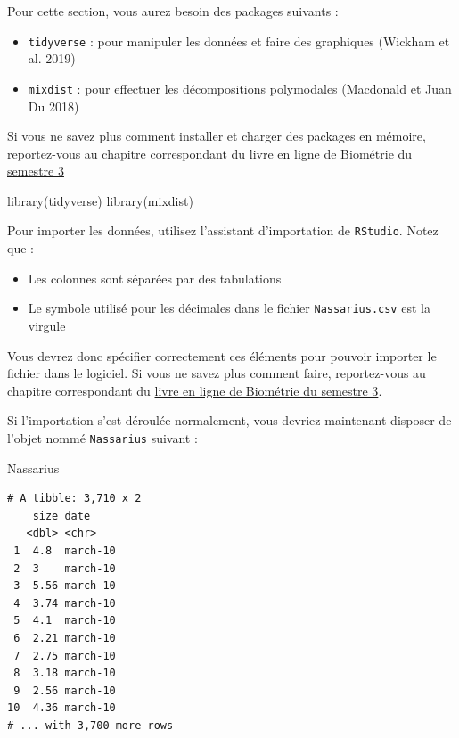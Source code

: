 \documentclass[
  a4paper,
  DIV=11,
  numbers=noendperiod,
  oneside]{scrreprt}
\newenvironment{Shaded}{}{}
\newcommand{\FunctionTok}[1]{\textcolor[rgb]{0.44,0.26,0.76}{#1}}
\newcommand{\NormalTok}[1]{\textcolor[rgb]{0.14,0.16,0.18}{#1}}
\providecommand{\tightlist}{%
  \setlength{\itemsep}{0pt}\setlength{\parskip}{0pt}}\usepackage{longtable,booktabs,array}
\begin{document}
Pour cette section, vous aurez besoin des packages suivants :

\begin{itemize}
\tightlist
\item
  \texttt{tidyverse} : pour manipuler les données et faire des
  graphiques (Wickham et al. 2019)
\item
  \texttt{mixdist} : pour effectuer les décompositions polymodales
  (Macdonald et Juan Du 2018)
\end{itemize}

Si vous ne savez plus comment installer et charger des packages en
mémoire, reportez-vous au chapitre correspondant du
\href{https://besibo.github.io/BiometrieS3/01-R-basics.html\#sec-packages}{livre
en ligne de Biométrie du semestre 3}

\begin{Shaded}
\begin{Highlighting}[]
\FunctionTok{library}\NormalTok{(tidyverse)}
\FunctionTok{library}\NormalTok{(mixdist)}
\end{Highlighting}
\end{Shaded}

Pour importer les données, utilisez l'assistant d'importation de
\texttt{RStudio}. Notez que :

\begin{itemize}
\tightlist
\item
  Les colonnes sont séparées par des tabulations
\item
  Le symbole utilisé pour les décimales dans le fichier
  \texttt{Nassarius.csv} est la virgule
\end{itemize}

Vous devrez donc spécifier correctement ces éléments pour pouvoir
importer le fichier dans le logiciel. Si vous ne savez plus comment
faire, reportez-vous au chapitre correspondant du
\href{https://besibo.github.io/BiometrieS3/04-DataWrangling.html\#plaintext}{livre
en ligne de Biométrie du semestre 3}.

Si l'importation s'est déroulée normalement, vous devriez maintenant
disposer de l'objet nommé \texttt{Nassarius} suivant :

\begin{Shaded}
\begin{Highlighting}[]
\NormalTok{Nassarius}
\end{Highlighting}
\end{Shaded}

\begin{verbatim}
# A tibble: 3,710 x 2
    size date    
   <dbl> <chr>   
 1  4.8  march-10
 2  3    march-10
 3  5.56 march-10
 4  3.74 march-10
 5  4.1  march-10
 6  2.21 march-10
 7  2.75 march-10
 8  3.18 march-10
 9  2.56 march-10
10  4.36 march-10
# ... with 3,700 more rows
\end{verbatim}
\end{document}
